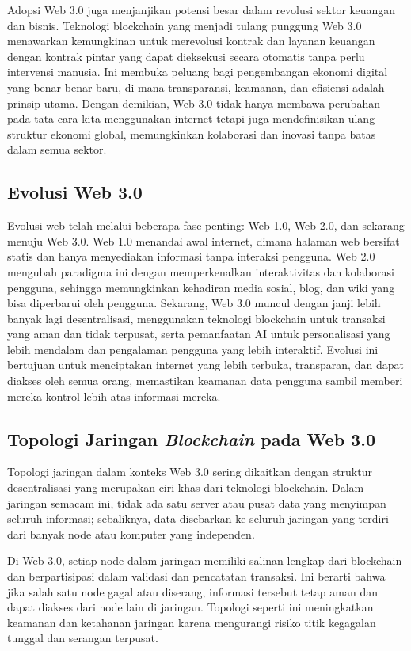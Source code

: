 Adopsi Web 3.0 juga menjanjikan potensi besar dalam revolusi sektor keuangan dan bisnis. Teknologi blockchain yang menjadi tulang punggung Web 3.0 menawarkan kemungkinan untuk merevolusi kontrak dan layanan keuangan dengan kontrak pintar yang dapat dieksekusi secara otomatis tanpa perlu intervensi manusia. Ini membuka peluang bagi pengembangan ekonomi digital yang benar-benar baru, di mana transparansi, keamanan, dan efisiensi adalah prinsip utama. Dengan demikian, Web 3.0 tidak hanya membawa perubahan pada tata cara kita menggunakan internet tetapi juga mendefinisikan ulang struktur ekonomi global, memungkinkan kolaborasi dan inovasi tanpa batas dalam semua sektor. \cite{bambacht2022web3}

\subsection{Evolusi Web 3.0}
Evolusi web telah melalui beberapa fase penting: Web 1.0, Web 2.0, dan sekarang menuju Web 3.0. Web 1.0 menandai awal internet, dimana halaman web bersifat statis dan hanya menyediakan informasi tanpa interaksi pengguna. Web 2.0 mengubah paradigma ini dengan memperkenalkan interaktivitas dan kolaborasi pengguna, sehingga memungkinkan kehadiran media sosial, blog, dan wiki yang bisa diperbarui oleh pengguna. Sekarang, Web 3.0 muncul dengan janji lebih banyak lagi desentralisasi, menggunakan teknologi blockchain untuk transaksi yang aman dan tidak terpusat, serta pemanfaatan AI untuk personalisasi yang lebih mendalam dan pengalaman pengguna yang lebih interaktif. Evolusi ini bertujuan untuk menciptakan internet yang lebih terbuka, transparan, dan dapat diakses oleh semua orang, memastikan keamanan data pengguna sambil memberi mereka kontrol lebih atas informasi mereka. \cite{Telerik}

\subsection{Topologi Jaringan \emph{Blockchain} pada Web 3.0}
Topologi jaringan dalam konteks Web 3.0 sering dikaitkan dengan struktur desentralisasi yang merupakan ciri khas dari teknologi blockchain. Dalam jaringan semacam ini, tidak ada satu server atau pusat data yang menyimpan seluruh informasi; sebaliknya, data disebarkan ke seluruh jaringan yang terdiri dari banyak node atau komputer yang independen.

Di Web 3.0, setiap node dalam jaringan memiliki salinan lengkap dari blockchain dan berpartisipasi dalam validasi dan pencatatan transaksi. Ini berarti bahwa jika salah satu node gagal atau diserang, informasi tersebut tetap aman dan dapat diakses dari node lain di jaringan. Topologi seperti ini meningkatkan keamanan dan ketahanan jaringan karena mengurangi risiko titik kegagalan tunggal dan serangan terpusat.

